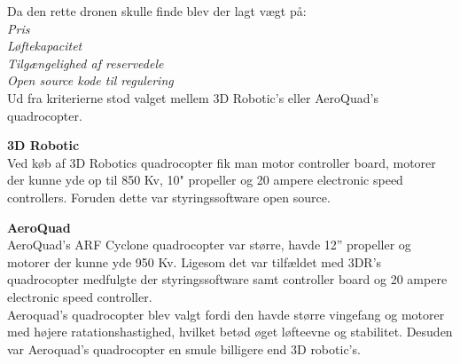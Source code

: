 Da den rette dronen skulle finde blev der lagt vægt på: \\
\textit{Pris}    \\
\textit{Løftekapacitet}\\
\textit{Tilgængelighed af reservedele} \\
\textit{Open source kode til regulering} \\

Ud fra kriterierne stod valget mellem 3D Robotic's eller AeroQuad's quadrocopter.

\textbf{3D Robotic}\\
Ved køb af 3D Robotics quadrocopter fik man motor controller board, motorer der kunne yde op til 850 Kv, 10" propeller og 20 ampere electronic speed controllers. Foruden dette var styringssoftware open source.

\textbf{AeroQuad}\\
AeroQuad's ARF Cyclone quadrocopter var større, havde 12” propeller og motorer der kunne yde 950 Kv. Ligesom det var tilfældet med 3DR's quadrocopter medfulgte der styringssoftware samt controller board og 20 ampere electronic speed controller.\\  

Aeroquad’s quadrocopter blev valgt fordi den havde større vingefang og motorer med højere ratationshastighed, hvilket betød øget løfteevne og stabilitet. Desuden var Aeroquad’s quadrocopter en smule billigere end 3D robotic's. 



